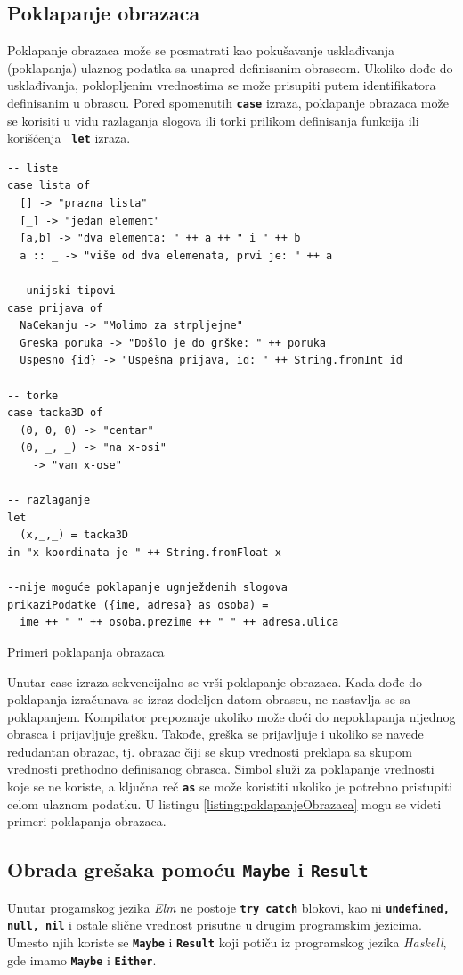 \documentclass[12pt,oneside]{memoir}
\begin{document}
\subsection{Poklapanje obrazaca}
Poklapanje obrazaca može se posmatrati kao pokušavanje usklađivanja (poklapanja) ulaznog
podatka sa unapred definisanim obrascom. Ukoliko dođe do usklađivanja, poklopljenim
vrednostima se može prisupiti putem identifikatora definisanim u obrascu. Pored spomenutih
\texttt{\textbf{case}} izraza, poklapanje obrazaca može se korisiti u vidu 
razlaganja slogova ili torki prilikom definisanja funkcija ili korišćenja \texttt{\textbf{
let}} izraza.
\begin{listing}[h]
\begin{verbatim}
-- liste 
case lista of
  [] -> "prazna lista"
  [_] -> "jedan element"
  [a,b] -> "dva elementa: " ++ a ++ " i " ++ b
  a :: _ -> "više od dva elemenata, prvi je: " ++ a

-- unijski tipovi
case prijava of
  NaCekanju -> "Molimo za strpljejne"
  Greska poruka -> "Došlo je do grške: " ++ poruka
  Uspesno {id} -> "Uspešna prijava, id: " ++ String.fromInt id

-- torke
case tacka3D of
  (0, 0, 0) -> "centar"
  (0, _, _) -> "na x-osi"
  _ -> "van x-ose"

-- razlaganje
let
  (x,_,_) = tacka3D
in "x koordinata je " ++ String.fromFloat x

--nije moguće poklapanje ugnježdenih slogova
prikaziPodatke ({ime, adresa} as osoba) =
  ime ++ " " ++ osoba.prezime ++ " " ++ adresa.ulica
\end{verbatim}
\caption{Primeri poklapanja obrazaca}
\label{listing:poklapanjeObrazaca}
\end{listing}

Unutar case izraza sekvencijalno se vrši poklapanje obrazaca. Kada dođe do poklapanja
izračunava se izraz dodeljen datom obrascu, ne nastavlja se sa poklapanjem. Kompilator
prepoznaje ukoliko može doći do nepoklapanja nijednog obrasca i prijavljuje grešku.
Takođe, greška se prijavljuje i ukoliko se navede redudantan obrazac, tj. obrazac čiji se
skup vrednosti preklapa sa skupom vrednosti prethodno definisanog obrasca.
Simbol \texttt{\textbf{\textunderscore}} služi za poklapanje vrednosti koje se ne koriste,
a ključna reč \texttt{\textbf{as}} se može koristiti ukoliko je potrebno pristupiti celom
ulaznom podatku. U listingu \ref{listing:poklapanjeObrazaca} mogu se videti primeri
poklapanja obrazaca.

\subsection{Obrada grešaka pomoću \texttt{\textbf{Maybe}} i \texttt{\textbf{Result}}}
Unutar progamskog jezika \emph{Elm} ne postoje \texttt{\textbf{try catch}} blokovi, kao ni \texttt{\textbf{undefined, null, nil}}
i ostale slične vrednost prisutne u drugim programskim jezicima.
Umesto njih koriste se \texttt{\textbf{Maybe}} i \texttt{\textbf{Result}} koji potiču iz programskog jezika \emph{Haskell},
gde imamo \texttt{\textbf{Maybe}} i \texttt{\textbf{Either}}.
\end{document}
